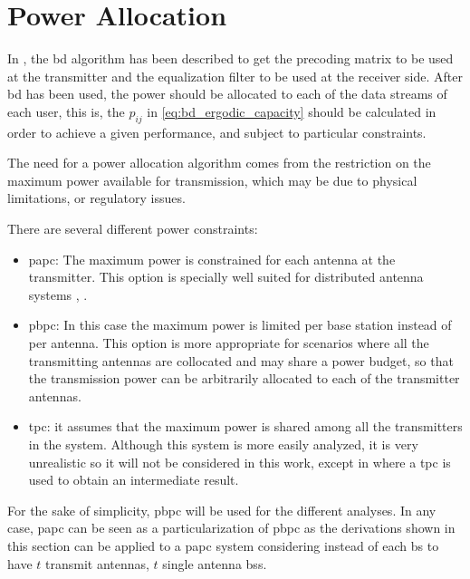 \section{Power Allocation}\label{sec:power_allocation}

In , the \gls{bd} algorithm has been described to get the precoding
matrix to be used at the transmitter and the equalization filter to be used at
the receiver side. After \gls{bd} has been used, the power should be allocated
to each of the data streams of each user, this is, the $p_{ij}$ in
\eqref{eq:bd_ergodic_capacity} should be calculated in order to achieve a given
performance, and subject to particular constraints.

The need for a power allocation algorithm comes from the restriction on the
maximum power available for transmission, which may be due to physical
limitations, or regulatory issues.

There are several different power constraints:

\begin{itemize}
    \item \gls{papc}: The maximum power is constrained for each antenna at the
        transmitter. This option is specially well suited for distributed
        antenna systems \cite{choi07}, \cite{lee12}.
    \item \gls{pbpc}: In this case the maximum power is limited per base station
        instead of per antenna. This option is more appropriate for scenarios
        where all the transmitting antennas are collocated and may share a power
        budget, so that the transmission power can be arbitrarily allocated to
        each of the transmitter antennas.
    \item \gls{tpc}: it assumes that the maximum power is shared among all the
        transmitters in the system. Although this system is more easily
        analyzed, it is very unrealistic so it will not be considered in this
        work, except in  where a \gls{tpc} is used to
        obtain an intermediate result.

\end{itemize}


For the sake of simplicity, \gls{pbpc} will be used for the different analyses. In any case, \gls{papc} can be seen as a particularization of \gls{pbpc} as the
derivations shown in this section can be applied to a \gls{papc} system
considering instead of each \gls{bs} to have $t$ transmit antennas, $t$ single
antenna \glspl{bs}.

